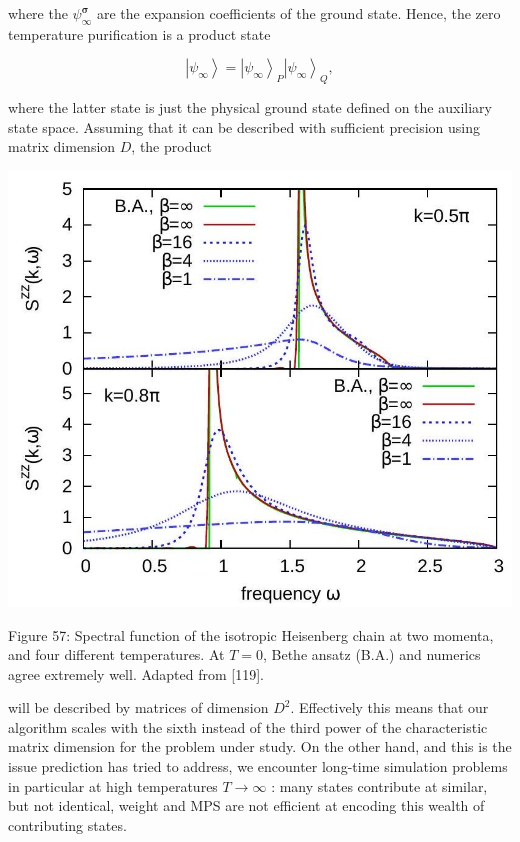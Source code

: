 \documentclass[12pt]{article}
\begin{document}
where the $\psi_{\infty}^{\boldsymbol{\sigma}}$ are the expansion coefficients of the ground state. Hence, the zero temperature purification is a product state


\begin{equation*}
\left|\psi_{\infty}\right\rangle=\left|\psi_{\infty}\right\rangle_{P}\left|\psi_{\infty}\right\rangle_{Q}, \tag{299}
\end{equation*}


where the latter state is just the physical ground state defined on the auxiliary state space. Assuming that it can be described with sufficient precision using matrix dimension $D$, the product

\begin{center}
\includegraphics[max width=\textwidth]{2024_05_04_afc4ad226da9ccfe0ac8g-097}
\end{center}

Figure 57: Spectral function of the isotropic Heisenberg chain at two momenta, and four different temperatures. At $T=0$, Bethe ansatz (B.A.) and numerics agree extremely well. Adapted from [119].

will be described by matrices of dimension $D^{2}$. Effectively this means that our algorithm scales with the sixth instead of the third power of the characteristic matrix dimension for the problem under study. On the other hand, and this is the issue prediction has tried to address, we encounter long-time simulation problems in particular at high temperatures $T \rightarrow \infty$ : many states contribute at similar, but not identical, weight and MPS are not efficient at encoding this wealth of contributing states.
\end{document}
